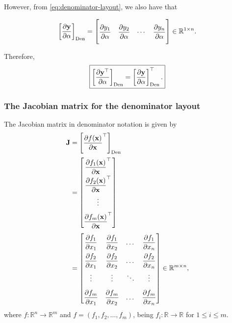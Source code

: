 However, from \eqref{eq:denominator-layout}, we also have that

\begin{align}
    \left[\dfrac{\partial \mathbf{y}}{\partial \alpha}\right]_{\textnormal{Den}} = \renewcommand{\arraystretch}{2.6}\begin{bmatrix}
        \dfrac{\partial y_{1}}{\partial \alpha} &
        \dfrac{\partial y_{2}}{\partial \alpha} &
        \cdots &
        \dfrac{\partial y_{n}}{\partial \alpha}\vspace{1.3ex}
    \end{bmatrix} \in \mathbb{R}^{1\times n}.
\end{align}

Therefore,
\begin{align}
    \boxed{\left[\dfrac{\partial \mathbf{y}^\top}{\partial \alpha}\right]_{\textnormal{Den}} = \left[\dfrac{\partial \mathbf{y}}{\partial \alpha}\right]_{\textnormal{Den}}^\top.}
\end{align}

\subsubsection{The Jacobian matrix for the denominator layout}
The Jacobian matrix in denominator notation is given by
\begin{align}
    \mathbf{J} & = \left[ \frac{\partial f(\mathbf{x})}{\partial \mathbf{x}}^{\top} \right]_{\textnormal{Den}} \\
    & = \renewcommand{\arraystretch}{2.2}\begin{bmatrix}
        \dfrac{\partial f_1(\mathbf{x})}{\partial \mathbf{x}}^\top \\ \dfrac{\partial f_2(\mathbf{x})}{\partial \mathbf{x}}^\top \\ \vdots \\ \dfrac{\partial f_m(\mathbf{x})}{\partial \mathbf{x}}^\top
    \end{bmatrix} \\
    & = \renewcommand{\arraystretch}{2.2}\begin{bmatrix}
        \dfrac{\partial f_1}{\partial x_1} & \dfrac{\partial f_1}{\partial x_2} & \dots & \dfrac{\partial f_1}{\partial x_n} \\
        \dfrac{\partial f_2}{\partial x_1} & \dfrac{\partial f_2}{\partial x_2} & \dots & \dfrac{\partial f_2}{\partial x_n} \\
        \vdots & \vdots & \ddots & \vdots \\
        \dfrac{\partial f_m}{\partial x_1} & \dfrac{\partial f_m}{\partial x_2} & \dots & \dfrac{\partial f_m}{\partial x_n} \\
    \end{bmatrix} \in \mathbb{R}^{m \times n},
\end{align}
where \(f: \mathbb{R}^{n} \rightarrow \mathbb{R}^{m}\) and \(f = (f_1, f_2, \dots, f_m)\), being \(f_i: \mathbb{R}\rightarrow\mathbb{R}\) for \(1 \leq i \leq m\).

